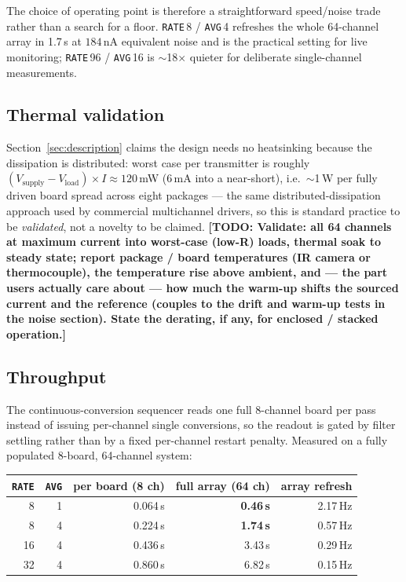 \documentclass[11pt]{article}
\newif\ifdraft\drafttrue
\newcommand{\todo}[1]{\ifdraft{\color{red}\textbf{[TODO: #1]}}\fi}
\begin{document}
The choice of operating point is therefore a straightforward speed/noise trade
rather than a search for a floor. \texttt{RATE}\,8 / \texttt{AVG}\,4 refreshes
the whole 64-channel array in 1.7\,s at $184$\,nA equivalent noise and is the
practical setting for live monitoring; \texttt{RATE}\,96 / \texttt{AVG}\,16 is
$\sim$18$\times$ quieter for deliberate single-channel measurements.

\subsection{Thermal validation}
\label{sec:thermal}
Section~\ref{sec:description} claims the design needs no heatsinking because
the dissipation is distributed: worst case per transmitter is roughly
$(V_\text{supply}-V_\text{load})\times I \approx 120$\,mW (6\,mA into a
near-short), i.e.\ $\sim$1\,W per fully driven board spread across eight
packages --- the same distributed-dissipation approach used by commercial
multichannel drivers, so this is standard practice to be \emph{validated}, not
a novelty to be claimed. \todo{Validate: all 64 channels at maximum current
into worst-case (low-R) loads, thermal soak to steady state; report package /
board temperatures (IR camera or thermocouple), the temperature rise above
ambient, and --- the part users actually care about --- how much the warm-up
shifts the sourced current and the reference (couples to the drift and warm-up
tests in the noise section). State the derating, if any, for enclosed /
stacked operation.}

\subsection{Throughput}
\label{sec:throughput}
The continuous-conversion sequencer reads one full 8-channel board per pass
instead of issuing per-channel single conversions, so the readout is gated by
filter settling rather than by a fixed per-channel restart penalty. Measured on
a fully populated 8-board, 64-channel system:

\medskip
\noindent\begin{tabular}{@{}rrrrr@{}}
\toprule
\textbf{\texttt{RATE}} & \textbf{\texttt{AVG}} & \textbf{per board (8 ch)} & \textbf{full array (64 ch)} & \textbf{array refresh} \\
\midrule
8  & 1 & 0.064\,s & \textbf{0.46\,s} & 2.17\,Hz \\
8  & 4 & 0.224\,s & \textbf{1.74\,s} & 0.57\,Hz \\
16 & 4 & 0.436\,s & 3.43\,s & 0.29\,Hz \\
32 & 4 & 0.860\,s & 6.82\,s & 0.15\,Hz \\
\bottomrule
\end{tabular}
\medskip
\end{document}
